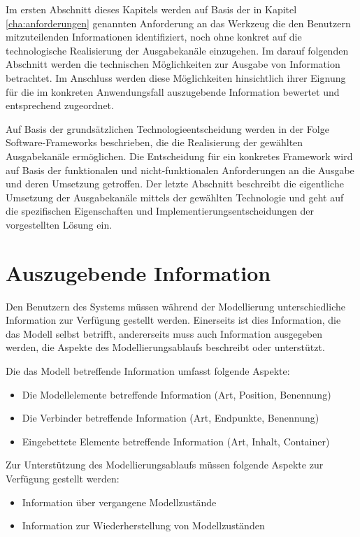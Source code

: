 Im ersten Abschnitt dieses Kapitels werden auf Basis der in Kapitel \ref{cha:anforderungen} genannten Anforderung an das Werkzeug die den Benutzern mitzuteilenden Informationen identifiziert, noch ohne konkret auf die technologische Realisierung der Ausgabekanäle einzugehen. Im darauf folgenden Abschnitt werden die technischen Möglichkeiten zur Ausgabe von Information betrachtet. Im Anschluss werden diese Möglichkeiten hinsichtlich ihrer Eignung für die im konkreten Anwendungsfall auszugebende Information bewertet und entsprechend zugeordnet.

Auf Basis der grundsätzlichen Technologieentscheidung werden in der Folge Software-Frameworks beschrieben, die die Realisierung der gewählten Ausgabekanäle ermöglichen. Die Entscheidung für ein konkretes Framework wird auf Basis der funktionalen und nicht-funktionalen Anforderungen an die Ausgabe und deren Umsetzung getroffen. Der letzte Abschnitt beschreibt die eigentliche Umsetzung der Ausgabekanäle mittels der gewählten Technologie und geht auf die spezifischen Eigenschaften und Implementierungsentscheidungen der vorgestellten Lösung ein.

\section{Auszugebende Information} %
\label{sec:auszugebende_information}

Den Benutzern des Systems müssen während der Modellierung unterschiedliche Information zur Verfügung gestellt werden. Einerseits ist dies Information, die das Modell selbst betrifft, andererseits muss auch Information ausgegeben werden, die Aspekte des Modellierungsablaufs beschreibt oder unterstützt.

Die das Modell betreffende Information umfasst folgende Aspekte:
\begin{itemize}
 \item Die Modellelemente betreffende Information (Art, Position, Benennung)
 \item Die Verbinder betreffende Information (Art, Endpunkte, Benennung)
 \item Eingebettete Elemente betreffende Information (Art, Inhalt, Container)
\end{itemize}

Zur Unterstützung des Modellierungsablaufs müssen folgende Aspekte zur Verfügung gestellt werden:
\begin{itemize}
 \item Information über vergangene Modellzustände
 \item Information zur Wiederherstellung von Modellzuständen
\end{itemize}

